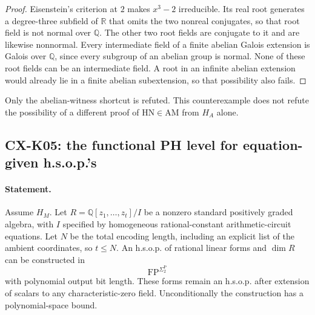 \begin{proof}
Eisenstein's criterion at $2$ makes $x^3-2$ irreducible. Its real root
generates a degree-three subfield of $\mathbb R$ that omits the two
nonreal conjugates, so that root field is not normal over $\mathbb Q$.
The other two root fields are conjugate to it and are likewise
nonnormal. Every intermediate field of a finite abelian Galois
extension is Galois over $\mathbb Q$, since every subgroup of an
abelian group is normal. None of these root fields can be an
intermediate field. A root in an infinite abelian extension would
already lie in a finite abelian subextension, so that possibility
also fails.
\end{proof}

Only the abelian-witness shortcut is refuted. This counterexample does
not refute the possibility of a different proof of
$\mathrm{HN}\in\mathrm{AM}$ from $H_A$ alone.

\subsection{CX-K05: the functional PH level for equation-given h.s.o.p.'s}
\label{cx:k05}

\paragraph{Statement.}
Assume $H_M$. Let
$R=\mathbb Q[z_1,\ldots,z_t]/I$ be a nonzero standard positively
graded algebra, with $I$ specified by homogeneous rational-constant
arithmetic-circuit equations. Let $N$ be the total encoding length,
including an explicit list of the ambient coordinates, so $t\le N$.
An h.s.o.p. of rational linear forms and $\dim R$ can be constructed
in
\[
 \mathrm{FP}^{\Sigma_2^{\mathrm P}}
\]
with polynomial output bit length. These forms remain an h.s.o.p.
after extension of scalars to any characteristic-zero field.
Unconditionally the construction has a polynomial-space bound.

